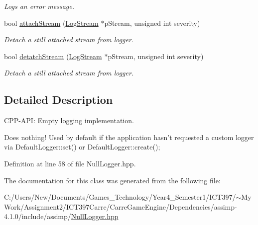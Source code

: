 \begin{CompactItemize}
\begin{CompactList}\small\item\em Logs an error message. \item\end{CompactList}\item 
\hypertarget{class_assimp_1_1_null_logger_31c05ecaee392b5fd34fd2dfd1cca559}{
bool \hyperlink{class_assimp_1_1_null_logger_31c05ecaee392b5fd34fd2dfd1cca559}{attachStream} (\hyperlink{class_assimp_1_1_log_stream}{LogStream} $\ast$pStream, unsigned int severity)}
\label{class_assimp_1_1_null_logger_31c05ecaee392b5fd34fd2dfd1cca559}

\begin{CompactList}\small\item\em Detach a still attached stream from logger. \item\end{CompactList}\item 
\hypertarget{class_assimp_1_1_null_logger_b49b14a0045aab73b813a448b5aa77b4}{
bool \hyperlink{class_assimp_1_1_null_logger_b49b14a0045aab73b813a448b5aa77b4}{detatchStream} (\hyperlink{class_assimp_1_1_log_stream}{LogStream} $\ast$pStream, unsigned int severity)}
\label{class_assimp_1_1_null_logger_b49b14a0045aab73b813a448b5aa77b4}

\begin{CompactList}\small\item\em Detach a still attached stream from logger. \item\end{CompactList}\end{CompactItemize}


\subsection{Detailed Description}
CPP-API: Empty logging implementation. 

Does nothing! Used by default if the application hasn't requested a custom logger via DefaultLogger::set() or DefaultLogger::create(); 

Definition at line 58 of file NullLogger.hpp.

The documentation for this class was generated from the following file:\begin{CompactItemize}
\item 
C:/Users/New/Documents/Games\_\-Technology/Year4\_\-Semester1/ICT397/$\sim$My Work/Assignment2/ICT397Carre/CarreGameEngine/Dependencies/assimp-4.1.0/include/assimp/\hyperlink{_null_logger_8hpp}{NullLogger.hpp}\end{CompactItemize}
